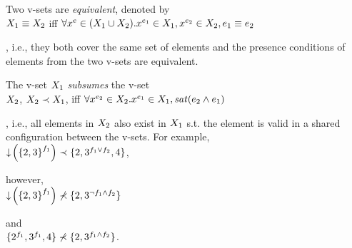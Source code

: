 \begin{definition} 
\label{def:vset-eq}
Two v-sets are \emph{equivalent}, denoted by\\
\ensuremath{\vset_1 \equiv \vset_2} iff
\ensuremath{
\forall \annot  \elem \in (\vset_1 \cup \vset_2). 
\annot [\dimMeta_1] \elem \in \vset_1, \annot [\dimMeta_2] \elem \in \vset_2, 
\dimMeta_1 \equiv \dimMeta_2}

,
i.e., they both cover the same set of elements and the presence conditions
of elements from the two v-sets are equivalent.
\end{definition}

%
\begin{definition} 
\label{def:vset-subsumption}
The v-set \ensuremath{\vset_1} \emph {subsumes} the v-set\\
\ensuremath{\vset_2}, $\subsume {\vset_2} {\vset_1}$, iff
\ensuremath{ \forall \annot [\dimMeta_2] \elem \in \vset_2.
\annot [\dimMeta_1] \elem \in \vset_1, 
\sat {\dimMeta_2 \wedge  \dimMeta_1}
}

,
i.e., all elements in $\vset_2$ also exist in $\vset_1$ 
s.t. the element is valid in a shared configuration between the v-sets.
For example, \\
\ensuremath{
 \subsume {\pushIn {\annot [\A] {\setDef {2,3}}}} {\setDef {2, \annot [\A \vee \B] 3, 4}}},

however, \\
\ensuremath{
 \nsubsume {\pushIn {\annot [\A] {\setDef {2,3}}}} {\setDef {2, \annot [\neg \A \wedge \B] 3}}}

and\\
\ensuremath{
\nsubsume {\setDef {\annot [\A] 2,\annot [\A] 3, 4}} {\setDef {2, \annot [\A \wedge \B] 3}}}.
\end{definition}





